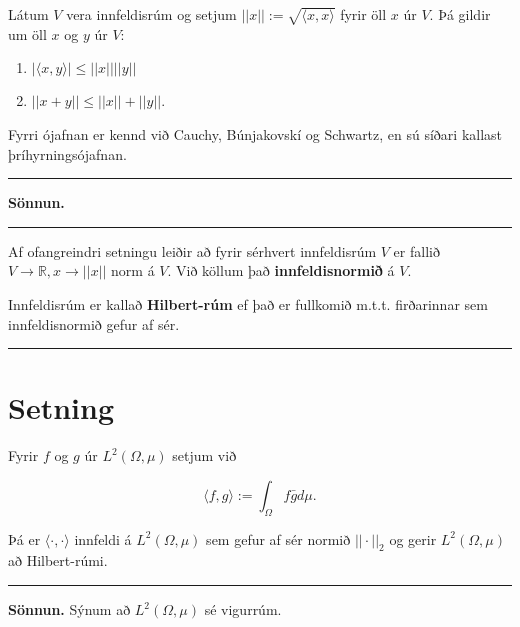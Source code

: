 \documentclass[]{book}
\providecommand{\tightlist}{%
  \setlength{\itemsep}{0pt}\setlength{\parskip}{0pt}}
\begin{document}
Látum \(V\) vera innfeldisrúm og setjum \(||x|| := \sqrt{\langle x,x \rangle}\) fyrir öll \(x\) úr \(V\). Þá gildir um öll \(x\) og \(y\) úr \(V\):

\begin{enumerate}
\def\labelenumi{\arabic{enumi}.}
\tightlist
\item
  \(|\langle x,y \rangle| \leq ||x|| ||y||\)
\item
  \(||x + y|| \leq ||x|| + ||y||\).
\end{enumerate}

Fyrri ójafnan er kennd við Cauchy, Búnjakovskí og Schwartz, en sú síðari kallast þríhyrningsójafnan.

\begin{center}\rule{0.5\linewidth}{\linethickness}\end{center}

\textbf{Sönnun.}

\begin{center}\rule{0.5\linewidth}{\linethickness}\end{center}

Af ofangreindri setningu leiðir að fyrir sérhvert innfeldisrúm \(V\) er fallið \(V\rightarrow\mathbb R, x\rightarrow||x||\) norm á \(V\). Við köllum það \textbf{innfeldisnormið} á \(V\).

Innfeldisrúm er kallað \textbf{Hilbert-rúm} ef það er fullkomið m.t.t. firðarinnar sem innfeldisnormið gefur af sér.

\begin{center}\rule{0.5\linewidth}{\linethickness}\end{center}

\hypertarget{setning-76}{%
\section*{Setning}\label{setning-76}}

Fyrir \(f\) og \(g\) úr \(L^2(\Omega,\mu)\) setjum við

\[
\langle f,g \rangle := \int_\Omega f\bar g d\mu.
\]

Þá er \(\langle \cdot,\cdot \rangle\) innfeldi á \(L^2(\Omega,\mu)\) sem gefur af sér normið \(||\cdot||_2\) og gerir \(L^2(\Omega,\mu)\) að Hilbert-rúmi.

\begin{center}\rule{0.5\linewidth}{\linethickness}\end{center}

\textbf{Sönnun.} Sýnum að \(L^2(\Omega,\mu)\) sé vigurrúm.
\end{document}
